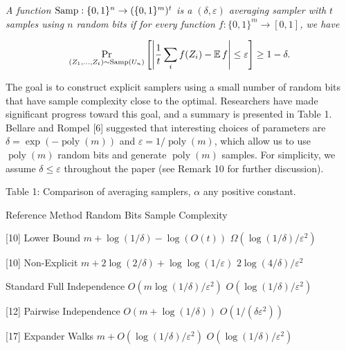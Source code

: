 \documentclass[10pt,a4paper]{article}
\begin{document}
\emph{A function $\textup{{Samp}}:\{0,1\}^{n}\to(\{0,1\}^{m})^{t}$ is a $(\delta,\varepsilon)$ averaging sampler with $t$ samples using $n$ random bits if for every function $f:\{0,1\}^{m}\to[0,1]$, we have}\par


\[\begin{gathered}
\Pr_{(Z_{1},\dots,Z_{t})\sim\textup{{Samp}}(U_{n})}\left[\left|\frac{1}{t}\sum_{i}f(Z_{i})-\operatorname*{\mathbb{E}}f\right|\leq\varepsilon\right]\geq 1-\delta.
\end{gathered}\]






The goal is to construct explicit samplers using a small number of random bits that have sample complexity close to the optimal. Researchers have made significant progress toward this goal, and a summary is presented in Table 1.
Bellare and Rompel [6] suggested that interesting choices of parameters are $\delta=\exp(-\operatorname*{poly}(m))$ and $\varepsilon=1/\operatorname*{poly}(m)$, which allow us to use $\operatorname*{poly}(m)$ random bits and generate $\operatorname*{poly}(m)$ samples.
For simplicity, we assume $\delta\leq\varepsilon$ throughout the paper (see Remark 10 for further discussion).\par



Table 1: Comparison of averaging samplers, $\alpha$ any positive constant.




Reference 
Method 
Random Bits 
Sample Complexity 
\par


[10] 
Lower Bound 
$m+\log(1/\delta)-\log(O(t))$ 
$\Omega(\log(1/\delta)/\varepsilon^{2})$ 
\par


[10] 
Non-Explicit 
$m+2\log(2/\delta)+\log\log(1/\varepsilon)$ 
$2\log(4/\delta)/\varepsilon^{2}$ 
\par


Standard 
Full Independence 
$O(m\log(1/\delta)/\varepsilon^{2})$ 
$O(\log(1/\delta)/\varepsilon^{2})$ 
\par


[12] 
Pairwise Independence 
$O(m+\log(1/\delta))$ 
$O(1/(\delta\varepsilon^{2}))$ 
\par


[17] 
Expander Walks 
$m+O(\log(1/\delta)/\varepsilon^{2})$ 
$O(\log(1/\delta)/\varepsilon^{2})$ 
\par
\end{document}
